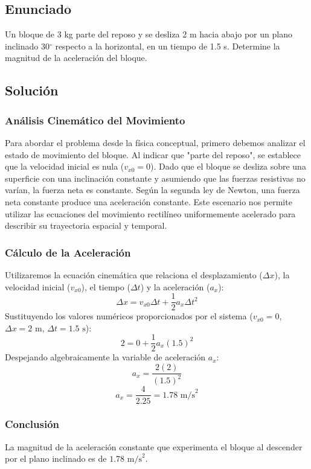 \documentclass[12pt]{article}
\begin{document}
\subsection*{Enunciado}
Un bloque de 3 kg parte del reposo y se desliza 2 m hacia abajo por un plano inclinado 30$^\circ$ respecto a la horizontal, en un tiempo de 1.5 s. Determine la magnitud de la aceleración del bloque.

\subsection*{Solución}

\subsubsection*{Análisis Cinemático del Movimiento}
Para abordar el problema desde la física conceptual, primero debemos analizar el estado de movimiento del bloque. Al indicar que "parte del reposo", se establece que la velocidad inicial es nula ($v_{x0} = 0$). Dado que el bloque se desliza sobre una superficie con una inclinación constante y asumiendo que las fuerzas resistivas no varían, la fuerza neta es constante. Según la segunda ley de Newton, una fuerza neta constante produce una aceleración constante. Este escenario nos permite utilizar las ecuaciones del movimiento rectilíneo uniformemente acelerado para describir su trayectoria espacial y temporal.

\subsubsection*{Cálculo de la Aceleración}
Utilizaremos la ecuación cinemática que relaciona el desplazamiento ($\Delta x$), la velocidad inicial ($v_{x0}$), el tiempo ($\Delta t$) y la aceleración ($a_x$):
$$\Delta x = v_{x0}\Delta t + \frac{1}{2}a_x\Delta t^2$$
Sustituyendo los valores numéricos proporcionados por el sistema ($v_{x0} = 0$, $\Delta x = 2 \text{ m}$, $\Delta t = 1.5 \text{ s}$):
$$2 = 0 + \frac{1}{2}a_x(1.5)^2$$
Despejando algebraicamente la variable de aceleración $a_x$:
$$a_x = \frac{2(2)}{(1.5)^2}$$
$$a_x = \frac{4}{2.25} = 1.78 \text{ m/s}^2$$

\subsubsection*{Conclusión}
La magnitud de la aceleración constante que experimenta el bloque al descender por el plano inclinado es de $1.78 \text{ m/s}^2$.
\end{document}
